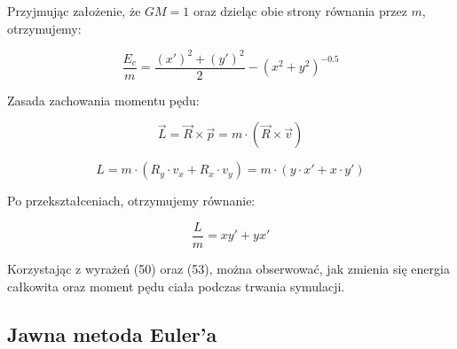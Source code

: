 \documentclass{article}
\begin{document}
	Przyjmując założenie, że $GM = 1$ oraz dzieląc obie strony równania przez $m$, otrzymujemy:

	\begin{equation}
		\frac{E_c}{m} = \frac{(x')^2+(y')^2}{2} - (x^2+y^2)^{-0.5}
	\end{equation}

	

	Zasada zachowania momentu pędu:

	\begin{equation}
		\overrightarrow{L} = \overrightarrow{R} \times \overrightarrow{p} = m \cdot (\overrightarrow{R} \times \overrightarrow{v})
	\end{equation}

	\begin{equation}
		L = m \cdot (R_y \cdot v_x + R_x \cdot v_y) = m \cdot (y \cdot x' + x \cdot y')
	\end{equation}

	Po przekształceniach, otrzymujemy równanie:

	\begin{equation}
		\frac{L}{m} = xy'+yx'
	\end{equation}

	Korzystając z wyrażeń (50) oraz (53), można obserwować, jak zmienia się energia całkowita oraz moment pędu ciała podczas trwania symulacji.


	\subsection*{Jawna metoda Euler'a}

	


	

	
	
	
\end{document}
